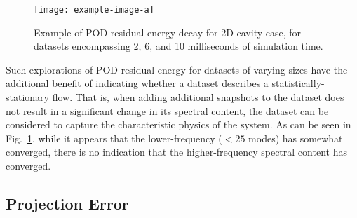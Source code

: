 \begin{figure}
	\centering
	\texttt{[image: example-image-a]}
	\caption{\label{fig:samplePODEnergy}Example of POD residual energy decay for 2D cavity case, for datasets encompassing 2, 6, and 10 milliseconds of simulation time.}
\end{figure}

Such explorations of POD residual energy for datasets of varying sizes have the additional benefit of indicating whether a dataset describes a statistically-stationary flow. That is, when adding additional snapshots to the dataset does not result in a significant change in its spectral content, the dataset can be considered to capture the characteristic physics of the system. As can be seen in Fig.~\ref{fig:samplePODEnergy}, while it appears that the lower-frequency ($< 25$ modes) has somewhat converged, there is no indication that the higher-frequency spectral content has converged.

\subsection{Projection Error}\label{subsec:projError}

